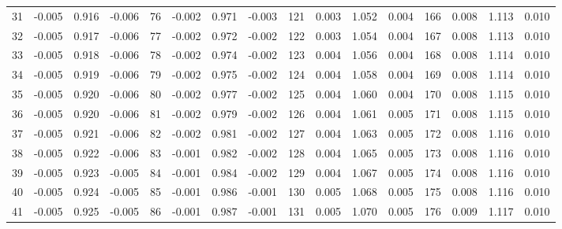 \begin{table}
{\begin{tabular}{rrrr|rrrr|rrrr|crrr}
 31 & \tiny{ -0.005} &   0.916 & \tiny{ -0.006} &  76 & \tiny{ -0.002} &   0.971 & \tiny{ -0.003} & 121 & \tiny{  0.003} &   1.052 & \tiny{  0.004} & 166 & \tiny{  0.008} &   1.113 & \tiny{  0.010}\\
 32 & \tiny{ -0.005} &   0.917 & \tiny{ -0.006} &  77 & \tiny{ -0.002} &   0.972 & \tiny{ -0.002} & 122 & \tiny{  0.003} &   1.054 & \tiny{  0.004} & 167 & \tiny{  0.008} &   1.113 & \tiny{  0.010}\\
 33 & \tiny{ -0.005} &   0.918 & \tiny{ -0.006} &  78 & \tiny{ -0.002} &   0.974 & \tiny{ -0.002} & 123 & \tiny{  0.004} &   1.056 & \tiny{  0.004} & 168 & \tiny{  0.008} &   1.114 & \tiny{  0.010}\\
 34 & \tiny{ -0.005} &   0.919 & \tiny{ -0.006} &  79 & \tiny{ -0.002} &   0.975 & \tiny{ -0.002} & 124 & \tiny{  0.004} &   1.058 & \tiny{  0.004} & 169 & \tiny{  0.008} &   1.114 & \tiny{  0.010}\\
 35 & \tiny{ -0.005} &   0.920 & \tiny{ -0.006} &  80 & \tiny{ -0.002} &   0.977 & \tiny{ -0.002} & 125 & \tiny{  0.004} &   1.060 & \tiny{  0.004} & 170 & \tiny{  0.008} &   1.115 & \tiny{  0.010}\\
 36 & \tiny{ -0.005} &   0.920 & \tiny{ -0.006} &  81 & \tiny{ -0.002} &   0.979 & \tiny{ -0.002} & 126 & \tiny{  0.004} &   1.061 & \tiny{  0.005} & 171 & \tiny{  0.008} &   1.115 & \tiny{  0.010}\\
 37 & \tiny{ -0.005} &   0.921 & \tiny{ -0.006} &  82 & \tiny{ -0.002} &   0.981 & \tiny{ -0.002} & 127 & \tiny{  0.004} &   1.063 & \tiny{  0.005} & 172 & \tiny{  0.008} &   1.116 & \tiny{  0.010}\\
 38 & \tiny{ -0.005} &   0.922 & \tiny{ -0.006} &  83 & \tiny{ -0.001} &   0.982 & \tiny{ -0.002} & 128 & \tiny{  0.004} &   1.065 & \tiny{  0.005} & 173 & \tiny{  0.008} &   1.116 & \tiny{  0.010}\\
 39 & \tiny{ -0.005} &   0.923 & \tiny{ -0.005} &  84 & \tiny{ -0.001} &   0.984 & \tiny{ -0.002} & 129 & \tiny{  0.004} &   1.067 & \tiny{  0.005} & 174 & \tiny{  0.008} &   1.116 & \tiny{  0.010}\\
 40 & \tiny{ -0.005} &   0.924 & \tiny{ -0.005} &  85 & \tiny{ -0.001} &   0.986 & \tiny{ -0.001} & 130 & \tiny{  0.005} &   1.068 & \tiny{  0.005} & 175 & \tiny{  0.008} &   1.116 & \tiny{  0.010}\\
 41 & \tiny{ -0.005} &   0.925 & \tiny{ -0.005} &  86 & \tiny{ -0.001} &   0.987 & \tiny{ -0.001} & 131 & \tiny{  0.005} &   1.070 & \tiny{  0.005} & 176 & \tiny{  0.009} &   1.117 & \tiny{  0.010}\\

\end{tabular}}
\end{table}
